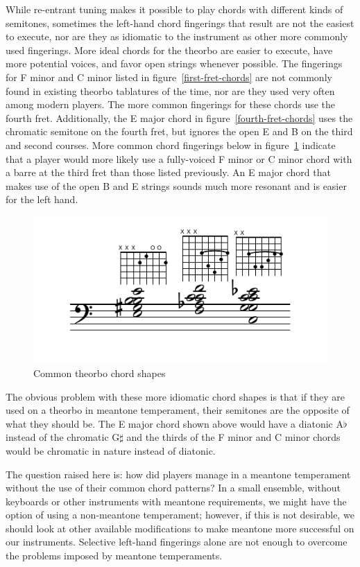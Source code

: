While re-entrant tuning makes it possible to play chords with different kinds of
semitones, sometimes the left-hand chord fingerings that result are not the easiest to
execute, nor are they as idiomatic to the instrument as other more commonly used
fingerings. More ideal chords for the theorbo are easier to execute, have more potential
voices, and favor open strings whenever possible.  The fingerings for F
minor and C minor listed in figure~\ref{first-fret-chords} are not commonly found in
existing theorbo tablatures of the time, nor are they used very often among modern
players. The more common fingerings for these chords use the fourth fret.
Additionally, the E major chord in figure~\ref{fourth-fret-chords} uses the chromatic
semitone on the fourth fret, but ignores the open E and B on the third and second
courses. More common chord fingerings below in figure~\ref{common-chords} indicate that
a player would more likely use a fully-voiced F minor or C minor chord with a barre at
the third fret than those listed previously.  An E major chord that makes use of the
open B and E strings sounds much more resonant and is easier for the left hand.
\begin{figure}[h]
\centering
\includegraphics{examples/common-chords.pdf}
\caption{Common theorbo chord shapes}
\label{common-chords}
\end{figure}
The obvious problem with these more idiomatic chord shapes is that if they are used on
a theorbo in meantone temperament, their semitones are the opposite of what they should be.
The E major chord shown above would have a diatonic A$\flat$ instead of the chromatic
G$\sharp$ and the thirds of the F minor and C minor chords would be chromatic in nature
instead of diatonic.

The question raised here is: how did players manage in a meantone temperament
without the use of their common chord patterns?  In a small ensemble, without
keyboards or other instruments with meantone requirements, we might have the
option of using a non-meantone temperament; however, if this is not desirable,
we should look at other available modifications to make meantone more successful
on our instruments. Selective left-hand fingerings alone are not enough to overcome
the problems imposed by meantone temperaments.

